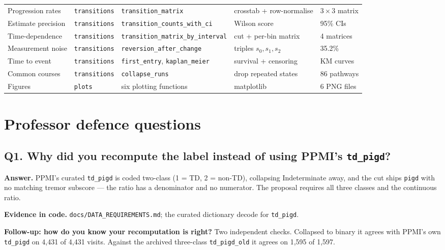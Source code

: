 \documentclass[11pt,a4paper]{article}
\newcommand{\code}[1]{\texttt{\small #1}}
\begin{document}
\begin{longtable}{@{}p{2.3cm} p{2.2cm} p{3.7cm} p{2.9cm} p{2.4cm}@{}}
Progression rates & \code{transitions} & \code{transition\_matrix} & crosstab + row-normalise & $3\times3$ matrix \\
Estimate precision & \code{transitions} & \code{transition\_counts\_}\newline\code{with\_ci} & Wilson score & 95\% CIs \\
Time-dependence & \code{transitions} & \code{transition\_matrix\_}\newline\code{by\_interval} & cut + per-bin matrix & 4 matrices \\
Measurement noise & \code{transitions} & \code{reversion\_}\newline\code{after\_change} & triples $s_0,s_1,s_2$ & 35.2\% \\
Time to event & \code{transitions} & \code{first\_entry}, \code{kaplan\_meier} & survival + censoring & KM curves \\
Common courses & \code{transitions} & \code{collapse\_runs} & drop repeated states & 86 pathways \\
Figures & \code{plots} & six plotting functions & matplotlib & 6 PNG files \\
\bottomrule
\end{longtable}

\section{Professor defence questions}
\label{sec:defence}

\subsection*{Q1. Why did you recompute the label instead of using PPMI's \code{td\_pigd}?}
\textbf{Answer.} PPMI's curated \code{td\_pigd} is coded two-class (1 = TD,
2 = non-TD), collapsing Indeterminate away, and the cut ships \code{pigd} with
no matching tremor subscore --- the ratio has a denominator and no numerator.
The proposal requires all three classes and the continuous ratio.

\textbf{Evidence in code.} \code{docs/DATA\_REQUIREMENTS.md}; the curated
dictionary decode for \code{td\_pigd}.

\textbf{Follow-up: how do you know your recomputation is right?} Two
independent checks. Collapsed to binary it agrees with PPMI's own
\code{td\_pigd} on 4{,}431 of 4{,}431 visits. Against the archived three-class
\code{td\_pigd\_old} it agrees on 1{,}595 of 1{,}597.
\end{document}
